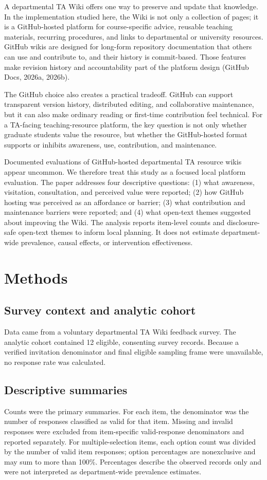 \documentclass[11pt]{article}
\begin{document}
A departmental TA Wiki offers one way to preserve and update that knowledge. In the implementation studied here, the Wiki is not only a collection of pages; it is a GitHub-hosted platform for course-specific advice, reusable teaching materials, recurring procedures, and links to departmental or university resources. GitHub wikis are designed for long-form repository documentation that others can use and contribute to, and their history is commit-based. Those features make revision history and accountability part of the platform design (GitHub Docs, 2026a, 2026b).

The GitHub choice also creates a practical tradeoff. GitHub can support transparent version history, distributed editing, and collaborative maintenance, but it can also make ordinary reading or first-time contribution feel technical. For a TA-facing teaching-resource platform, the key question is not only whether graduate students value the resource, but whether the GitHub-hosted format supports or inhibits awareness, use, contribution, and maintenance.

Documented evaluations of GitHub-hosted departmental TA resource wikis appear uncommon. We therefore treat this study as a focused local platform evaluation. The paper addresses four descriptive questions: (1) what awareness, visitation, consultation, and perceived value were reported; (2) how GitHub hosting was perceived as an affordance or barrier; (3) what contribution and maintenance barriers were reported; and (4) what open-text themes suggested about improving the Wiki. The analysis reports item-level counts and disclosure-safe open-text themes to inform local planning. It does not estimate department-wide prevalence, causal effects, or intervention effectiveness.

\section{Methods}
\subsection{Survey context and analytic cohort}
Data came from a voluntary departmental TA Wiki feedback survey. The analytic cohort contained 12 eligible, consenting survey records. Because a verified invitation denominator and final eligible sampling frame were unavailable, no response rate was calculated.

\subsection{Descriptive summaries}
Counts were the primary summaries. For each item, the denominator was the number of responses classified as valid for that item. Missing and invalid responses were excluded from item-specific valid-response denominators and reported separately. For multiple-selection items, each option count was divided by the number of valid item responses; option percentages are nonexclusive and may sum to more than 100\%. Percentages describe the observed records only and were not interpreted as department-wide prevalence estimates.
\end{document}
